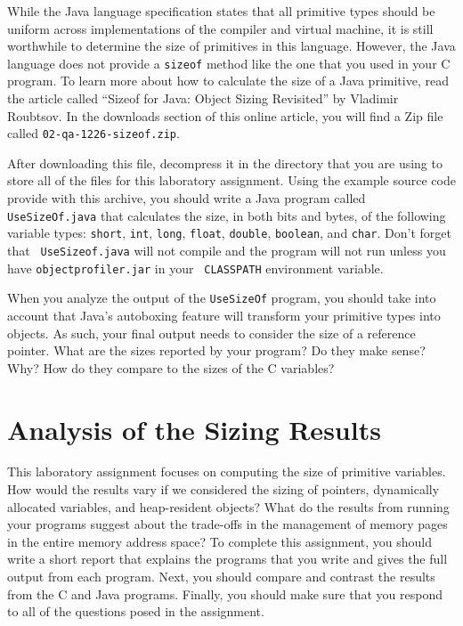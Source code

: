   While the Java language specification states that all primitive types should be uniform across implementations of the
  compiler and virtual machine, it is still worthwhile to determine the size of primitives in this language. However,
  the Java language does not provide a {\tt sizeof} method like the one that you used in your C program. To learn more
  about how to calculate the size of a Java primitive, read the article called ``Sizeof for Java: Object Sizing
  Revisited'' by Vladimir Roubtsov. In the downloads section of this online article, you will find a Zip file called
  {\tt 02-qa-1226-sizeof.zip}. 

  After downloading this file, decompress it in the directory that you are using to store all of the files for this
  laboratory assignment. Using the example source code provide with this archive, you should write a Java program called
  {\tt UseSizeOf.java} that calculates the size, in both bits and bytes, of the following variable types:  {\tt short},
  {\tt int}, {\tt long}, {\tt float}, {\tt double}, {\tt boolean}, and {\tt char}. Don't forget that {\tt
  UseSizeof.java} will not compile and the program will not run unless you have {\tt objectprofiler.jar} in your {\tt
  CLASSPATH} environment variable. 
  
  When you analyze the output of the {\tt UseSizeOf} program, you should take into account that Java's autoboxing
  feature will transform your primitive types into objects.  As such, your final output needs to consider the size of a
  reference pointer. What are the sizes reported by your program? Do they make sense? Why? How do they compare to
  the sizes of the C variables?

\section*{Analysis of the Sizing Results}

  This laboratory assignment focuses on computing the size of primitive variables. How would the results vary if we
  considered the sizing of pointers, dynamically allocated variables, and heap-resident objects? What do the results
  from running your programs suggest about the trade-offs in the management of memory pages in the entire memory address
  space? To complete this assignment, you should write a short report that explains the programs that you write and
  gives the full output from each program.  Next, you should compare and contrast the results from the C and Java
  programs. Finally, you should make sure that you respond to all of the questions posed in the assignment.

